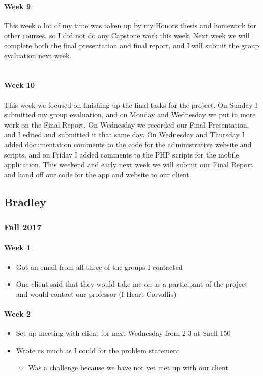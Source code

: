 \documentclass[onecolumn, draftclsnofoot,10pt, compsoc]{IEEEtran}
\begin{document}
      \paragraph{Week 9}
      This week a lot of my time was taken up by my Honors thesis and homework for other courses, so I did not do any Capstone work this week. Next week we will complete both the final presentation and final report, and I will submit the group evaluation next week. \\ \\

      \paragraph{Week 10}
      This week we focused on finishing up the final tasks for the project. On Sunday I submitted my group evaluation, and on Monday and Wednesday we put in more work on the Final Report. On Wednesday we recorded our Final Presentation, and I edited and submitted it that same day. On Wednesday and Thursday I added documentation comments to the code for the administrative website and scripts, and on Friday I added comments to the PHP scripts for the mobile application. This weekend and early next week we will submit our Final Report and hand off our code for the app and website to our client. \newpage

  \subsection{Bradley}
    \subsubsection{Fall 2017}
      \paragraph{Week 1}
        \begin{itemize}
          \item Got an email from all three of the groups I contacted
          \item One client said that they would take me on as a participant of the project and would contact our professor (I Heart Corvallis)
        \end{itemize}

      \paragraph{Week 2}
        \begin{itemize}
          \item Set up meeting with client for next Wednesday from 2-3 at Snell 150
          \item Wrote as much as I could for the problem statement
            \begin{itemize}
              \item Was a challenge because we have not yet met up with our client
            \end{itemize}
        \end{itemize}
\end{document}

